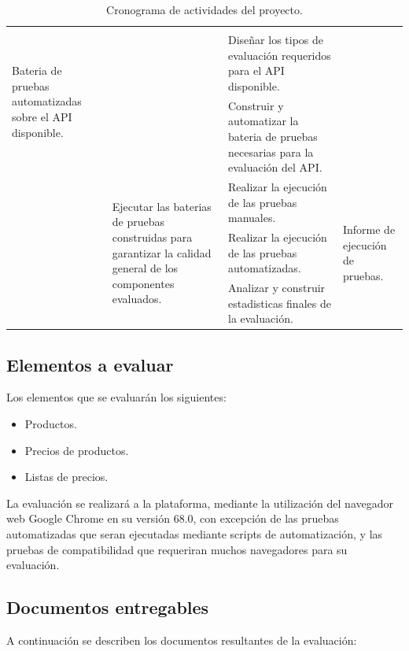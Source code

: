\begin{table}
\begin{tabular}{|l|l|p{6.5cm}|l|}
\multirow{3}{4.0cm}{Bateria de pruebas automatizadas sobre el API disponible.} \\
\cline{3-3}
& & Diseñar los tipos de evaluación requeridos para el API disponible. & \\
\cline{3-3}
& & Construir y automatizar la bateria de pruebas necesarias para la evaluación del API. & \\
\cline{2-4}
& \multirow{3}{4.0cm}{Ejecutar las baterias de pruebas construidas para garantizar la calidad general de los componentes evaluados.} &
Realizar la ejecución de las pruebas manuales. &
\multirow{3}{4.0cm}{Informe de ejecución de pruebas.} \\
\cline{3-3}
& & Realizar la ejecución de las pruebas automatizadas. & \\
\cline{3-3}
& & Analizar y construir estadisticas finales de la evaluación. & \\
\hline
\end{tabular}
\caption{Cronograma de actividades del proyecto.}
\label{cronograma}
\end{table}

\subsection{Elementos a evaluar}
Los elementos que se evaluarán los siguientes:

\begin{itemize}
\item Productos.
\item Precios de productos.
\item Listas de precios.
\end{itemize}

La evaluación se realizará a la plataforma, mediante la utilización del navegador
web Google Chrome en su versión 68.0, con excepción de las pruebas automatizadas
que seran ejecutadas mediante scripts de automatización, y las pruebas de
compatibilidad que requeriran muchos navegadores para su evaluación.

\subsection{Documentos entregables}
A continuación se describen los documentos resultantes de la evaluación:

